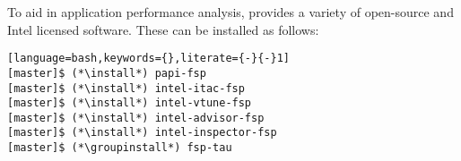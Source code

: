 To aid in application performance analysis, \OHPC{} provides a variety of
open-source and Intel licensed software. These can be installed as follows:

\begin{lstlisting}[language=bash,keywords={},literate={-}{-}1]
[master]$ (*\install*) papi-fsp
[master]$ (*\install*) intel-itac-fsp
[master]$ (*\install*) intel-vtune-fsp
[master]$ (*\install*) intel-advisor-fsp
[master]$ (*\install*) intel-inspector-fsp
[master]$ (*\groupinstall*) fsp-tau
\end{lstlisting}
